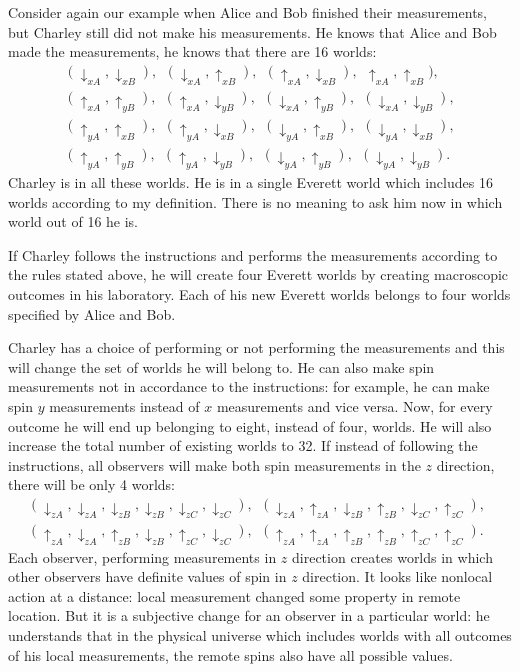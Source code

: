 \documentclass[12pt]{article}
\begin{document}
 Consider again our example when Alice and Bob finished their measurements, but Charley still did not make his measurements. He knows that Alice and Bob made the measurements, he knows that there are 16 worlds:
 \begin{eqnarray}
\nonumber
 (\downarrow_{xA}, \downarrow_{xB}),~~(\downarrow_{xA}, \uparrow_{xB}),~~(\uparrow_{xA}, \downarrow_{xB}),~~\uparrow_{xA}, \uparrow_{xB}),\\ \nonumber
 (\uparrow_{xA}, \uparrow_{yB}),    ~~(\uparrow_{xA}, \downarrow_{yB}),
 ~~(\downarrow_{xA}, \uparrow_{yB}),~~(\downarrow_{xA}, \downarrow_{yB}), \\
 (\uparrow_{yA}, \uparrow_{xB}),~~(\uparrow_{yA}, \downarrow_{xB}), ~~(\downarrow_{yA}, \uparrow_{xB}),~~(\downarrow_{yA}, \downarrow_{xB}),\\
 (\uparrow_{yA}, \uparrow_{yB}),  ~~(\uparrow_{yA}, \downarrow_{yB}),~~(\downarrow_{yA}, \uparrow_{yB}),~~(\downarrow_{yA}, \downarrow_{yB}).\nonumber
  \end{eqnarray}
 Charley is in all these worlds. He is in a single Everett world which includes 16 worlds according to my definition. There is no meaning to ask him now in which world out of 16 he is.

 If Charley follows the instructions and performs the measurements according to the rules stated above, he will create four Everett worlds by creating macroscopic outcomes in his laboratory. Each of his new Everett worlds belongs to four worlds specified by Alice and Bob.
  
  Charley has a choice of performing or not performing the measurements and this will change the set of worlds he  will belong to. He can also make spin measurements not in accordance to the instructions: for example, he can make spin $y$ measurements instead of $x$ measurements and vice versa. Now, for every outcome he will end up belonging to eight, instead of four, worlds. He will also increase the total number of existing worlds to 32. If instead of following the instructions, all observers will make both spin measurements in the $z$ direction, there will be only 4 worlds:
\begin{eqnarray}
\nonumber
 (\downarrow_{zA},\downarrow_{zA},\downarrow_{zB},\downarrow_{zB}, \downarrow_{zC}, \downarrow_{zC}),~~
  (\downarrow_{zA},\uparrow_{zA},\downarrow_{zB},\uparrow_{zB}, \downarrow_{zC}, \uparrow_{zC}),~~\\
   (\uparrow_{zA},\downarrow_{zA},\uparrow_{zB},\downarrow_{zB}, \uparrow_{zC}, \downarrow_{zC}),~~
    (\uparrow_{zA},\uparrow_{zA},\uparrow_{zB},\uparrow_{zB}, \uparrow_{zC}, \uparrow_{zC}).~~
   \end{eqnarray}
Each observer, performing measurements in  $z$ direction creates worlds in which other observers have definite values of spin in $z$ direction. It looks like nonlocal action at a distance: local measurement changed some property in remote location. But it is a subjective change for an observer in a particular world: he  understands that in the physical universe which includes worlds with all outcomes of his local measurements, the remote spins also have all possible values.
\end{document}

